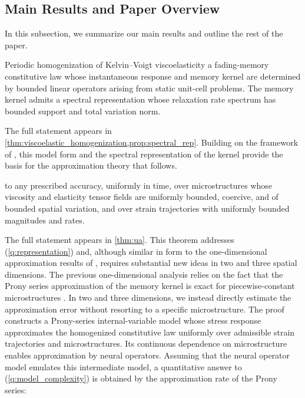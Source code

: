 \documentclass[3p, 12pt, preprint]{elsarticle}
\begin{document}
\subsection{Main Results and Paper Overview}\label{subsec:overview_results}

In this subsection, we summarize our main results and outline the rest of the paper.

\begin{mainresult}\label{res:homogenized_model}
Periodic homogenization of Kelvin--Voigt viscoelasticity  a fading-memory constitutive law whose instantaneous response and memory kernel are determined by bounded linear operators arising from static unit-cell problems. The memory kernel admits a spectral representation whose relaxation rate spectrum has bounded support and total variation norm.
\end{mainresult}


The full statement appears in \cref{thm:viscoelastic_homogenization,prop:spectral_rep}. 
Building on the framework of \cite{francfort1986homogenization}, this model form and the 
spectral representation of the kernel provide the basis for the approximation theory that follows.

\begin{mainresult}\label{res:ua}
 to any prescribed accuracy, uniformly in time, over microstructures whose viscosity and elasticity tensor fields are uniformly bounded, coercive, and of bounded spatial variation, and over strain trajectories with uniformly bounded magnitudes and rates.
\end{mainresult}

The full statement appears in \cref{thm:ua}. This theorem addresses (\ref{q:representation}) and,
although similar in form to the one-dimensional approximation results of \cite{bhattacharya2025learning},
requires substantial new ideas in two and three spatial dimensions. The previous one-dimensional analysis relies on the fact that the Prony series approximation of the memory kernel {\color{blue}\cite{baumgaertel1989determination,tschoegl1989phenomenological,baumgaertel1992interrelation,park1999methods,beylkin2005approximation,ortiz2026linear}} is exact for piecewise-constant microstructures \cite{bhattacharya2023learning}. In two and three dimensions, we instead directly estimate the approximation error without resorting to a specific microstructure. The proof constructs a Prony-series internal-variable model whose stress response approximates the homogenized constitutive law uniformly over admissible strain trajectories and microstructures. Its continuous dependence on microstructure enables approximation by neural operators. Assuming that the neural operator model emulates this intermediate model, a quantitative answer to (\ref{q:model_complexity}) is obtained by the approximation rate of the Prony series:
\end{document}
